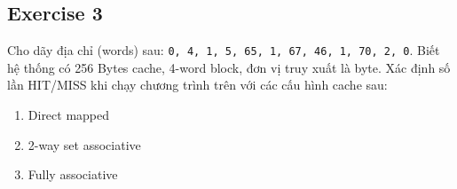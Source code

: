 \subsection{Exercise 3}
Cho dãy địa chỉ (words) sau: \texttt{0, 4, 1, 5, 65, 1, 67, 46, 1, 70, 2, 0}.
Biết hệ thống có 256 Bytes cache, 4-word block, đơn vị truy xuất là byte.
Xác định số lần HIT/MISS khi chạy chương trình trên với các cấu hình cache sau:
\begin{enumerate}[label=(\alph*), itemsep=0pt]
  \item Direct mapped
  \item 2-way set associative
  \item Fully associative
\end{enumerate}

